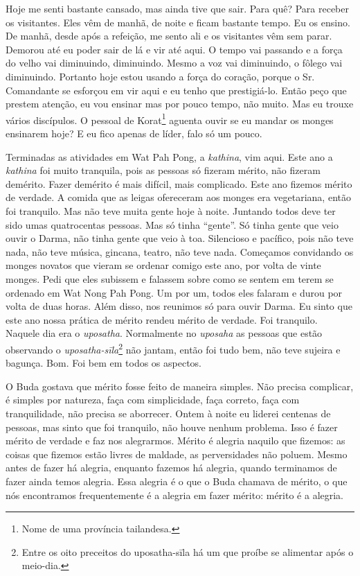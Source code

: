 Hoje me senti bastante cansado, mas ainda tive que sair. Para quê?
Para receber os visitantes. Eles vêm de manhã, de noite e ficam
bastante tempo. Eu os ensino. De manhã, desde após a refeição, me sento
ali e os visitantes vêm sem parar. Demorou até eu poder sair de lá e
vir até aqui. O tempo vai passando e a força do velho vai diminuindo,
diminuindo. Mesmo a voz vai diminuindo, o fôlego vai diminuindo.
Portanto hoje estou usando a força do coração, porque o Sr. Comandante
se esforçou em vir aqui e eu tenho que prestigiá-lo. Então peço que
prestem atenção, eu vou ensinar mas por pouco tempo, não muito. Mas eu
trouxe vários discípulos. O pessoal de Korat\footnote{Nome de uma
província tailandesa.} aguenta ouvir se eu mandar os monges ensinarem
hoje? E eu fico apenas de líder, falo só um pouco. 

Terminadas as atividades em Wat Pah Pong, a \textit{kathina}, vim
aqui. Este ano a \textit{kathina} foi muito tranquila, pois as pessoas
só fizeram mérito, não fizeram demérito. Fazer demérito é mais difícil,
mais complicado. Este ano fizemos mérito de verdade. A comida que as
leigas ofereceram aos monges era vegetariana, então foi tranquilo. Mas
não teve muita gente hoje à noite. Juntando todos deve ter sido umas
quatrocentas pessoas. Mas só tinha “gente”. Só tinha gente que veio
ouvir o Darma, não tinha gente que veio à toa. Silencioso e pacífico,
pois não teve nada, não teve música, gincana, teatro, não teve nada.
Começamos convidando os monges novatos que vieram se ordenar comigo
este ano, por volta de vinte monges. Pedi que eles subissem e falassem
sobre como se sentem em terem se ordenado em Wat Nong Pah Pong. Um por
um, todos eles falaram e durou por volta de duas horas. Além disso, nos
reunimos só para ouvir Darma. Eu sinto que este ano nossa prática de
mérito rendeu mérito de verdade. Foi tranquilo. Naquele dia era o
\textit{uposatha}. Normalmente no \textit{uposaha} as pessoas que estão
observando o \textit{uposatha-sīla}\footnote{Entre os oito preceitos
do uposatha-sīla há um que proíbe se alimentar após o meio-dia.} não
jantam, então foi tudo bem, não teve sujeira e bagunça. Bom. Foi bem em
todos os aspectos. 

O Buda gostava que mérito fosse feito de maneira simples. Não
precisa complicar, é simples por natureza, faça com simplicidade, faça
correto, faça com tranquilidade, não precisa se aborrecer. Ontem à
noite eu liderei centenas de pessoas, mas sinto que foi tranquilo, não
houve nenhum problema. Isso é fazer mérito de verdade e faz nos
alegrarmos. Mérito é alegria naquilo que fizemos: as coisas que fizemos
estão livres de maldade, as perversidades não poluem. Mesmo antes de
fazer há alegria, enquanto fazemos há alegria, quando terminamos de
fazer ainda temos alegria. Essa alegria é o que o Buda chamava de
mérito, o que nós encontramos frequentemente é a alegria em fazer
mérito: mérito é a alegria. 

